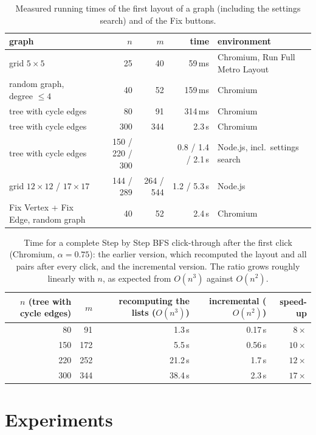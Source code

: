 \documentclass[11pt,a4paper]{article}
\begin{document}
\begin{table}[ht]
\centering\footnotesize
\setlength{\tabcolsep}{4pt}
\begin{tabular}{@{}l r r r l@{}}
\toprule
graph & $n$ & $m$ & time & environment\\
\midrule
grid $5\times5$ & 25 & 40 & 59\,ms & Chromium, Run Full Metro Layout\\
random graph, degree $\le4$ & 40 & 52 & 159\,ms & Chromium\\
tree with cycle edges & 80 & 91 & 314\,ms & Chromium\\
tree with cycle edges & 300 & 344 & 2.3\,s & Chromium\\
tree with cycle edges & 150 / 220 / 300 & & 0.8 / 1.4 / 2.1\,s & Node.js, incl.\ settings search\\
grid $12\times12$ / $17\times17$ & 144 / 289 & 264 / 544 & 1.2 / 5.3\,s & Node.js\\
Fix Vertex + Fix Edge, random graph & 40 & 52 & 2.4\,s & Chromium\\
\bottomrule
\end{tabular}
\caption{Measured running times of the first layout of a graph (including the settings search) and of the Fix buttons.}
\label{tab:time}
\end{table}

\begin{table}[ht]
\centering\footnotesize
\begin{tabular}{@{}r r r r r@{}}
\toprule
$n$ (tree with cycle edges) & $m$ & recomputing the lists ($O(n^3)$) & incremental ($O(n^2)$) & speed-up\\
\midrule
80 & 91 & 1.3\,s & 0.17\,s & $8\times$\\
150 & 172 & 5.5\,s & 0.56\,s & $10\times$\\
220 & 252 & 21.2\,s & 1.7\,s & $12\times$\\
300 & 344 & 38.4\,s & 2.3\,s & $17\times$\\
\bottomrule
\end{tabular}
\caption{Time for a complete Step by Step BFS click-through after the first click (Chromium, $\alpha=0.75$): the earlier version, which recomputed the layout and all pairs after every click, and the incremental version. The ratio grows roughly linearly with $n$, as expected from $O(n^3)$ against $O(n^2)$.}
\label{tab:steptime}
\end{table}

\section{Experiments}
\label{sec:experiments}
\end{document}
